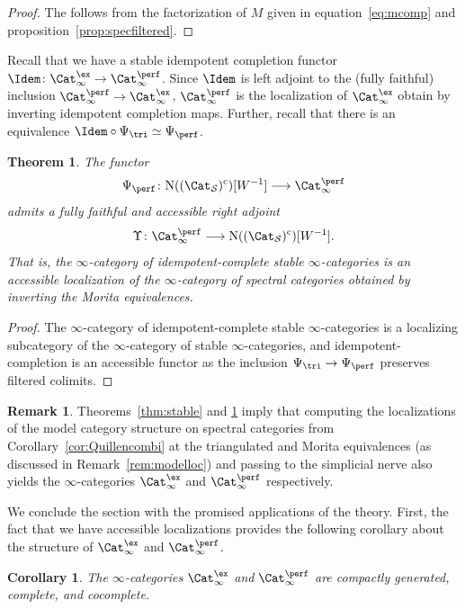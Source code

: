 \documentclass{amsart}
\newcommand{\htp}{\simeq}
\renewcommand{\to}{\mathchoice{\longrightarrow}{\rightarrow}{\rightarrow}{\rightarrow}}
\newcommand{\N}{\mathrm{N}}
\newcommand{\stabcat}{\Cat_\i^{\ex}}
\newcommand{\idemstabcat}{\Cat_\i^{\perf}}
\newcommand{\Spcat}{\Cat_\mathcal{S}}%
\renewcommand{\i}{\infty}
\newcommand{\spect}{\Upsilon}
\numberwithin{equation}{section}
\newtheorem{theorem}[equation]{Theorem}
\newtheorem{corollary}[equation]{Corollary}
\theoremstyle{definition}
\newtheorem{remark}[equation]{Remark}
\begin{document}
\begin{proof}
The follows from the factorization of $M$ given in
equation~\ref{eq:mcomp} and proposition~\ref{prop:specfiltered}.
\end{proof}

Recall that we have a stable idempotent completion functor
$\Idem\colon \Cat_\i^{\ex}\to\idemstabcat$.  Since $\Idem$ is left
adjoint to the (fully faithful) inclusion
$\idemstabcat\to\Cat_\i^{\ex}$, $\idemstabcat$ is the
localization of $\Cat_\i^{\ex}$ obtain by inverting idempotent
completion maps.  Further, recall that there is an equivalence $\Idem
\circ \Psi_{\tri} \htp \Psi_{\perf}$.

\begin{theorem}\label{thm:morita}
The functor
\[
\Psi_{\perf} \colon \N((\Spcat)^{\mathrm{c}})[W^{-1}] \to\idemstabcat
\]
admits a fully faithful and accessible right adjoint
\[
\spect \colon \idemstabcat\to \N((\Spcat)^{\mathrm{c}})[W^{-1}].
\]
That is, the $\i$-category of idempotent-complete stable
$\i$-categories is an accessible localization of the $\i$-category of
spectral categories obtained by inverting the Morita equivalences.
\end{theorem}

\begin{proof}
The $\i$-category of idempotent-complete stable $\i$-categories is a
localizing subcategory of the $\i$-category of stable $\i$-categories,
and idempotent-completion is an accessible functor as the
inclusion $\Psi_{\tri} \to \Psi_{\perf}$ preserves filtered colimits.
\end{proof}

\begin{remark}
Theorems~\ref{thm:stable} and \ref{thm:morita} imply that computing
the localizations of the model category structure on spectral
categories from Corollary~\ref{cor:Quillencombi} at the triangulated
and Morita equivalences (as discussed in Remark~\ref{rem:modelloc})
and passing to the simplicial nerve also yields the $\i$-categories
$\stabcat$ and $\idemstabcat$ respectively.
\end{remark}

We conclude the section with the promised applications of the theory.
First, the fact that we have accessible localizations provides the
following corollary about the structure of $\stabcat$ and
$\idemstabcat$.

\begin{corollary}\label{cor:cgen}
The $\i$-categories $\stabcat$ and $\idemstabcat$ are
compactly generated, complete, and cocomplete.
\end{corollary}
\end{document}
